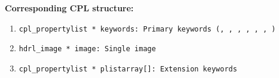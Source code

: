 \begin{datastructdef}
\textbf{Corresponding \ac{CPL} structure:}
\begin{enumerate}
    \item \texttt{cpl\_propertylist * keywords: Primary keywords (\hyperref[fits:dpr.catg]{},  \hyperref[fits:dpr.tech]{},  \hyperref[fits:dpr.type]{},  \hyperref[fits:ins.opti3.name]{},  \hyperref[fits:ins.opti9.name]{},  \hyperref[fits:ins.opti10.name]{}, \hyperref[fits:ins.opti20.name]{})}
    \item \texttt{hdrl\_image * image: Single image}
    \item \texttt{cpl\_propertylist * plistarray[]: Extension keywords}
\end{enumerate}
\end{datastructdef}
